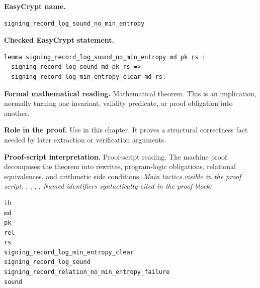 \begin{formaltheorem}
\noindent\textbf{EasyCrypt name.}
\begin{lstlisting}[language=EasyCrypt,basicstyle=\ttfamily\scriptsize]
signing_record_log_sound_no_min_entropy
\end{lstlisting}
\noindent\textbf{Checked EasyCrypt statement.}
\begin{lstlisting}[language=EasyCrypt,basicstyle=\ttfamily\scriptsize]
lemma signing_record_log_sound_no_min_entropy md pk rs :
  signing_record_log_sound md pk rs =>
  signing_record_log_min_entropy_clear md rs.
\end{lstlisting}
\noindent\textbf{Formal mathematical reading.}
Mathematical theorem. This is an implication, normally turning one invariant, validity predicate, or proof obligation into another.

\noindent\textbf{Role in the proof.}
Use in this chapter. It proves a structural correctness fact needed by later extraction or verification arguments.

\noindent\textbf{Proof-script interpretation.}
Proof-script reading. The machine proof decomposes the theorem into rewrites, program-logic obligations, relational equivalences, and arithmetic side conditions.
\emph{Main tactics visible in the proof script:} , , , .
\emph{Named identifiers syntactically cited in the proof block:}
\begin{lstlisting}[language=EasyCrypt,basicstyle=\ttfamily\scriptsize]
ih
md
pk
rel
rs
signing_record_log_min_entropy_clear
signing_record_log_sound
signing_record_relation_no_min_entropy_failure
sound
\end{lstlisting}

\end{formaltheorem}

